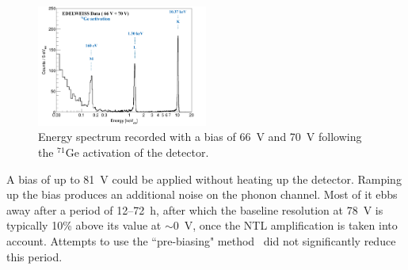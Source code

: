 \documentclass[aps,nofootinbib,floatfix,showpacs,preprintnumbers,twocolumn,superscriptaddress]{revtex4}
\begin{document}


 



\begin{figure}[t]
\includegraphics[width=0.5\textwidth,angle=0]{Figures/nouveauplotklm-nored30.pdf}
\caption{Energy spectrum recorded with a bias of 66~V and 70~V following the ${}^{71}\mathrm{Ge}$ activation of the detector. 
} 
\label{fig:spectrum}
\end{figure}

A bias of up to 81~V could be applied  without heating up the detector.
Ramping up the bias produces an additional noise on the phonon channel.
Most of it ebbs away after a period of 12--72~h, after which the baseline resolution at 78~V is typically 10\% above its value at $\sim$0~V, once the NTL amplification is taken into account. 
Attempts to use the ``pre-biasing" method~\cite{CDMS-2019-erratum} did not significantly reduce this period.
\end{document}
